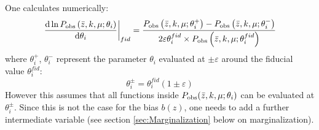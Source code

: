 	One calculates numerically: 
	\begin{equation}
	\left.\frac{\mbox{d}\ln P_{{\rm obs}}\left(\bar{z},k,\mu;\theta_{i}\right)}{\mbox{d}\theta_{i}}\right|_{fid}=\frac{P_{{\rm obs}}\left(\bar{z},k,\mu;\theta_{i}^{+}\right)-P_{{\rm obs}}\left(\bar{z},k,\mu;\theta_{i}^{-}\right)}{2\varepsilon\theta_{i}^{fid}\times P_{{\rm obs}}\left(\bar{z},k,\mu;\theta_{i}^{fid}\right)}
	\end{equation}
	where $\theta_{i}^{+}$, $\theta_{i}^{-}$ represent the parameter
	$\theta_{i}$ evaluated at $\pm\varepsilon$ around the fiducial value
	$\theta_{i}^{fid}$:
	\begin{equation}
	\theta_{i}^{\pm}=\theta_{i}^{fid}(1\pm\varepsilon)
	\end{equation}
	However this assumes that all functions inside $P_{{\rm obs}}(\bar{z},k,\mu;\theta_{i})$
	can be evaluated at $\theta_{i}^{\pm}$. Since this is not the case
	for the bias $b(z)$, one needs to add a further intermediate variable
	(see section \ref{sec:Marginalization} below on marginalization).
	
